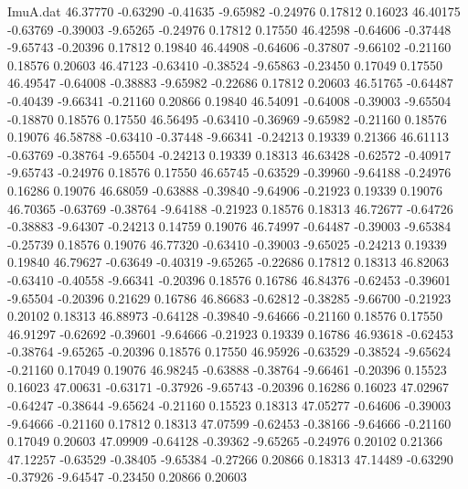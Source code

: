\begin{filecontents}{ImuA.dat}
  46.37770   -0.63290   -0.41635   -9.65982   -0.24976    0.17812    0.16023
  46.40175   -0.63769   -0.39003   -9.65265   -0.24976    0.17812    0.17550
  46.42598   -0.64606   -0.37448   -9.65743   -0.20396    0.17812    0.19840
  46.44908   -0.64606   -0.37807   -9.66102   -0.21160    0.18576    0.20603
  46.47123   -0.63410   -0.38524   -9.65863   -0.23450    0.17049    0.17550
  46.49547   -0.64008   -0.38883   -9.65982   -0.22686    0.17812    0.20603
  46.51765   -0.64487   -0.40439   -9.66341   -0.21160    0.20866    0.19840
  46.54091   -0.64008   -0.39003   -9.65504   -0.18870    0.18576    0.17550
  46.56495   -0.63410   -0.36969   -9.65982   -0.21160    0.18576    0.19076
  46.58788   -0.63410   -0.37448   -9.66341   -0.24213    0.19339    0.21366
  46.61113   -0.63769   -0.38764   -9.65504   -0.24213    0.19339    0.18313
  46.63428   -0.62572   -0.40917   -9.65743   -0.24976    0.18576    0.17550
  46.65745   -0.63529   -0.39960   -9.64188   -0.24976    0.16286    0.19076
  46.68059   -0.63888   -0.39840   -9.64906   -0.21923    0.19339    0.19076
  46.70365   -0.63769   -0.38764   -9.64188   -0.21923    0.18576    0.18313
  46.72677   -0.64726   -0.38883   -9.64307   -0.24213    0.14759    0.19076
  46.74997   -0.64487   -0.39003   -9.65384   -0.25739    0.18576    0.19076
  46.77320   -0.63410   -0.39003   -9.65025   -0.24213    0.19339    0.19840
  46.79627   -0.63649   -0.40319   -9.65265   -0.22686    0.17812    0.18313
  46.82063   -0.63410   -0.40558   -9.66341   -0.20396    0.18576    0.16786
  46.84376   -0.62453   -0.39601   -9.65504   -0.20396    0.21629    0.16786
  46.86683   -0.62812   -0.38285   -9.66700   -0.21923    0.20102    0.18313
  46.88973   -0.64128   -0.39840   -9.64666   -0.21160    0.18576    0.17550
  46.91297   -0.62692   -0.39601   -9.64666   -0.21923    0.19339    0.16786
  46.93618   -0.62453   -0.38764   -9.65265   -0.20396    0.18576    0.17550
  46.95926   -0.63529   -0.38524   -9.65624   -0.21160    0.17049    0.19076
  46.98245   -0.63888   -0.38764   -9.66461   -0.20396    0.15523    0.16023
  47.00631   -0.63171   -0.37926   -9.65743   -0.20396    0.16286    0.16023
  47.02967   -0.64247   -0.38644   -9.65624   -0.21160    0.15523    0.18313
  47.05277   -0.64606   -0.39003   -9.64666   -0.21160    0.17812    0.18313
  47.07599   -0.62453   -0.38166   -9.64666   -0.21160    0.17049    0.20603
  47.09909   -0.64128   -0.39362   -9.65265   -0.24976    0.20102    0.21366
  47.12257   -0.63529   -0.38405   -9.65384   -0.27266    0.20866    0.18313
  47.14489   -0.63290   -0.37926   -9.64547   -0.23450    0.20866    0.20603

\end{filecontents}
